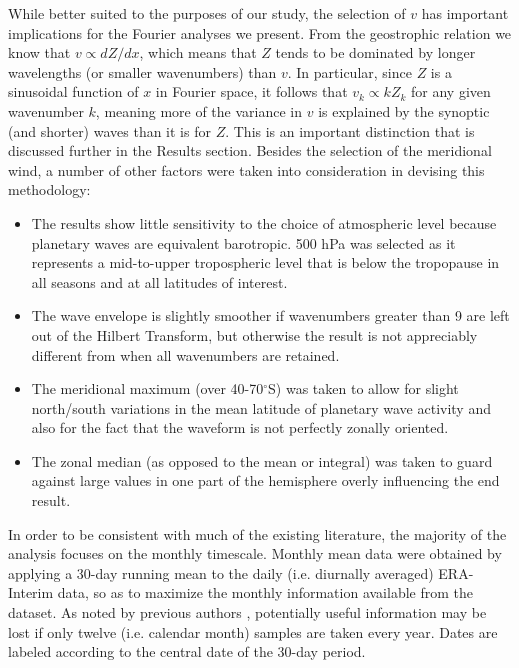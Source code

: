 While better suited to the purposes of our study, the selection of $v$ has important implications for the Fourier analyses we present. From the geostrophic relation we know that $v \propto dZ / dx$, which means that $Z$ tends to be dominated by longer wavelengths (or smaller wavenumbers) than $v$. In particular, since $Z$ is a sinusoidal function of $x$ in Fourier space, it follows that $v_k \propto k Z_k$ for any given wavenumber $k$, meaning more of the variance in $v$ is explained by the synoptic (and shorter) waves than it is for $Z$. This is an important distinction that is discussed further in the Results section. Besides the selection of the meridional wind, a number of other factors were taken into consideration in devising this methodology:
\begin{itemize}
\item The results show little sensitivity to the choice of atmospheric level because planetary waves are equivalent barotropic. 500 hPa was selected as it represents a mid-to-upper tropospheric level that is below the tropopause in all seasons and at all latitudes of interest.
\item The wave envelope is slightly smoother if wavenumbers greater than 9 are left out of the Hilbert Transform, but otherwise the result is not appreciably different from when all wavenumbers are retained.
\item The meridional maximum (over 40-70$^{\circ}$S) was taken to allow for slight north/south variations in the mean latitude of planetary wave activity and also for the fact that the waveform is not perfectly zonally oriented. 
\item The zonal median (as opposed to the mean or integral) was taken to guard against large values in one part of the hemisphere overly influencing the end result.
\end{itemize}

In order to be consistent with much of the existing literature, the majority of the analysis focuses on the monthly timescale. Monthly mean data were obtained by applying a 30-day running mean to the daily (i.e. diurnally averaged) ERA-Interim data, so as to maximize the monthly information available from the dataset. As noted by previous authors \citep[e.g.][]{Kidson1988}, potentially useful information may be lost if only twelve (i.e. calendar month) samples are taken every year. Dates are labeled according to the central date of the 30-day period.   
    